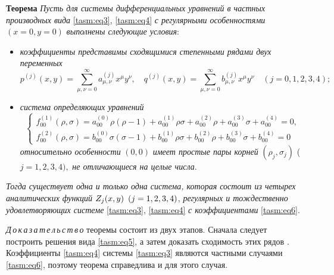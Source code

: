 \smallskip

\textbf{\small \sc Теорема} 
\emph{Пусть для системы дифференциальных уравнений в частных производных вида} \eqref{tasm:eq3}, \eqref{tasm:eq4} 
\emph{с регулярными особенностями} $(x=0, y=0)$ \emph{выполнены следующие условия}\/:

\begin{itemize}
\item[1)] \emph{коэффициенты представимы сходящимися степенными рядами двух переменных}
\begin{equation}
p^{(j)}(x,y)=\sum_{\mu,\nu=0}^{\infty} a_{\mu,\nu}^{(j)}   
x^{\mu}    y^{\nu}, \quad 
q^{(j)}(x,y)=\sum_{\mu,\nu=0}^{\infty} b_{\mu,\nu}^{(j)}   
x^{\mu}    y^{\nu} \quad{}(j=0, 1, 2, 3, 4);
\label{tasm:eq6}
\end{equation}

\item[2)] \emph{система определяющих уравнений 
\begin{equation}
\left\{
\begin{array}{l}
f_{00}^{(1)}(\rho, \sigma)=a_{00}^{(0)}    \rho(\rho-1)+
a_{00}^{(1)}    \rho \sigma+a_{00}^{(2)}\rho+a_{00}^{(3)}
\sigma+ a_{00}^{(4)}=0,\\[0.2cm]
f_{00}^{(2)}(\rho, \sigma)=b_{00}^{(0)}    \sigma(\sigma-1)+
b_{00}^{(1)}    \rho \sigma+b_{00}^{(2)}\rho+b_{00}^{(3)}
\sigma+ b_{00}^{(4)}=0
\end{array}
\right.
\label{tasm:eq7}
\end{equation}
относительно особенности}
$(0, 0)$
\emph{имеет простые пары корней} $(\rho_{j}, \sigma_{j})$ ($j=1, 2, 3,  4),$ \emph{не отличающиеся на целые числа}.

\end{itemize}

\emph{Тогда существует одна и только одна система, которая состоит
из четырех аналитических функций }$Z_{j}(x,y) \enskip
(j=1, 2, 3,  4)$, \emph{регулярных и тождественно
удовлетворяющих системе} \eqref{tasm:eq3}, \eqref{tasm:eq4} \emph{с коэффициентами} \eqref{tasm:eq6}.


\smallskip

\emph{Д\,о\,к\,а\,з\,а\,т\,е\,л\,ь\,с\,т\,в\,о}\/ теоремы состоит из двух этапов. 
Сначала следует построить решения вида \eqref{tasm:eq5}, а затем доказать сходимость этих рядов \cite{tasm:3}. 
Коэффициенты \eqref{tasm:eq4} системы \eqref{tasm:eq3}  являются частными случаями  \eqref{tasm:eq6},
поэтому теорема справедлива и для этого случая.

\smallskip

